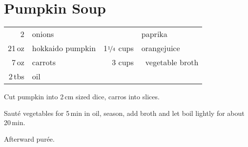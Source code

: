 
\section{Pumpkin Soup}
\begin{centering}

\end{centering}
\begin{table}[H]
\centering
\begin{tabular*}{1\textwidth}{rlrl}
2 & onions && paprika \\
21\,oz & hokkaido pumpkin & 1$\nicefrac{1}{4}$ cups & orangejuice \\
7\,oz & carrots & 3 cups &\ vegetable broth \\
2\,tbs & oil &&\\
\end{tabular*}
\end{table}
\begin{Notes}
\item Cut pumpkin into 2\,cm sized dice, carros into slices.
\item Saut\'{e} vegetables for 5\,min in oil, season, add broth and let boil lightly for about  20\,min.
\item Afterward pur\'{e}e.
\end{Notes}



